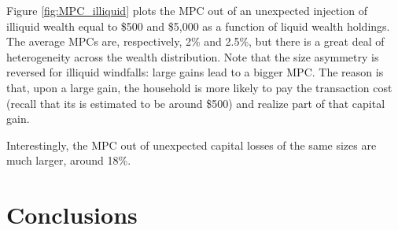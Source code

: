 Figure \ref{fig:MPC_illiquid} plots the MPC out of an unexpected injection of illiquid wealth equal to \$500 and \$5,000 as a function of liquid wealth holdings. The average MPCs are, respectively, 2\% and 2.5\%, but there is a great deal of heterogeneity across the wealth distribution. Note that the size asymmetry is reversed for illiquid windfalls: large gains lead to a bigger MPC. The reason is that, upon a large gain, the household is more likely to pay the transaction cost (recall that its is estimated to be around \$500) and realize part of that capital gain.  

Interestingly, the MPC out of unexpected capital losses of the same sizes are much larger, around 18\%.  

\section{Conclusions}
\label{sec:conclusions}


